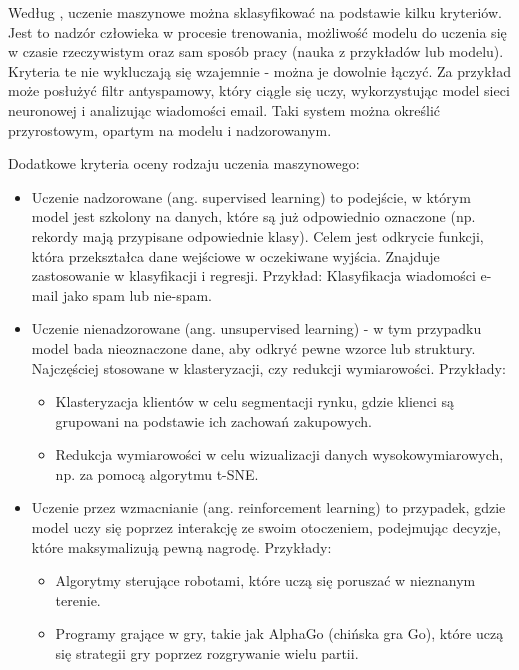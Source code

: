 Według \cite{Geron2020}, uczenie maszynowe można sklasyfikować na podstawie kilku kryteriów.
Jest to nadzór człowieka w procesie trenowania, możliwość modelu do uczenia się w czasie rzeczywistym
oraz sam sposób pracy (nauka z przykładów lub modelu). Kryteria te nie wykluczają się wzajemnie - można je dowolnie łączyć.
Za przykład może posłużyć filtr antyspamowy, który ciągle się uczy,
wykorzystując model sieci neuronowej i analizując wiadomości email.
Taki system można określić przyrostowym, opartym na modelu i nadzorowanym.

Dodatkowe kryteria oceny rodzaju uczenia maszynowego:
\begin{itemize}[label=-,labelsep=0.4cm,leftmargin=0.6cm]
    \item Uczenie nadzorowane (ang. supervised learning) to podejście, w którym model jest szkolony na danych,
        które są już odpowiednio oznaczone (np. rekordy mają przypisane odpowiednie klasy).
        Celem jest odkrycie funkcji, która przekształca dane wejściowe w oczekiwane wyjścia.
        Znajduje zastosowanie w klasyfikacji i regresji.
        Przykład: Klasyfikacja wiadomości e-mail jako spam lub nie-spam.
    \item Uczenie nienadzorowane (ang. unsupervised learning)
        - w tym przypadku model bada nieoznaczone dane, aby odkryć pewne wzorce lub struktury.
        Najczęściej stosowane w klasteryzacji, czy redukcji wymiarowości. Przykłady:
        \begin{itemize}[label=*,labelsep=0.4cm,leftmargin=0.8cm]
            \item Klasteryzacja klientów w celu segmentacji rynku, gdzie klienci są grupowani na podstawie ich zachowań zakupowych. 
            \item Redukcja wymiarowości w celu wizualizacji danych wysokowymiarowych, np. za pomocą algorytmu t-SNE.
        \end{itemize}
    \item Uczenie przez wzmacnianie (ang. reinforcement learning) to przypadek,
        gdzie model uczy się poprzez interakcję ze swoim otoczeniem,
        podejmując decyzje, które maksymalizują pewną nagrodę. Przykłady:
        \begin{itemize}[label=*,labelsep=0.4cm,leftmargin=0.8cm]
            \item Algorytmy sterujące robotami, które uczą się poruszać w nieznanym terenie. 
            \item Programy grające w gry, takie jak AlphaGo (chińska gra Go), które uczą się strategii gry poprzez rozgrywanie wielu partii.
        \end{itemize}
\end{itemize}